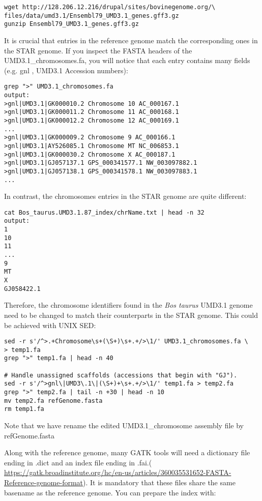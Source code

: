\begin{verbatim}
wget http://128.206.12.216/drupal/sites/bovinegenome.org/\
files/data/umd3.1/Ensembl79_UMD3.1_genes.gff3.gz
gunzip Ensembl79_UMD3.1_genes.gff3.gz
\end{verbatim}


It is crucial that entries in the reference genome match the corresponding ones in the STAR genome. If you inspect the FASTA headers of the UMD3.1\_chromosomes.fa, you will notice that each entry contains many fields (e.g. gnl , UMD3.1 Accession numbers):

\begin{verbatim}
grep ">" UMD3.1_chromosomes.fa
output:
>gnl|UMD3.1|GK000010.2 Chromosome 10 AC_000167.1
>gnl|UMD3.1|GK000011.2 Chromosome 11 AC_000168.1
>gnl|UMD3.1|GK000012.2 Chromosome 12 AC_000169.1
...
>gnl|UMD3.1|GK000009.2 Chromosome 9 AC_000166.1
>gnl|UMD3.1|AY526085.1 Chromosome MT NC_006853.1
>gnl|UMD3.1|GK000030.2 Chromosome X AC_000187.1
>gnl|UMD3.1|GJ057137.1 GPS_000341577.1 NW_003097882.1
>gnl|UMD3.1|GJ057138.1 GPS_000341578.1 NW_003097883.1
...
\end{verbatim}

In contrast, the chromosomes entries in the STAR genome are quite different:

\begin{verbatim}
cat Bos_taurus.UMD3.1.87_index/chrName.txt | head -n 32
output:
1
10
11
...
9
MT
X
GJ058422.1
\end{verbatim}

Therefore, the chromosome identifiers found in the \textit{Bos taurus} UMD3.1 genome need to be changed to match their counterparts in the STAR genome. This could be achieved with UNIX SED:

\begin{verbatim}
sed -r s'/^>.+Chromosome\s+(\S+)\s+.+/>\1/' UMD3.1_chromosomes.fa \
> temp1.fa
grep ">" temp1.fa | head -n 40

# Handle unassigned scaffolds (accessions that begin with "GJ").
sed -r s'/^>gnl\|UMD3\.1\|(\S+)+\s+.+/>\1/' temp1.fa > temp2.fa
grep ">" temp2.fa | tail -n +30 | head -n 10
mv temp2.fa refGenome.fasta
rm temp1.fa
\end{verbatim}

Note that we have rename the edited UMD3.1\_chromosome assembly file by refGenome.fasta

Along with the reference genome, many GATK tools will need a dictionary file ending in .dict and an index file ending in .fai.(\href{https://gatk.broadinstitute.org/hc/en-us/articles/360035531652-FASTA-Reference-genome-format}{ https://gatk.broadinstitute.org/hc/en-us/articles/360035531652-FASTA-Reference-genome-format}). It is mandatory that these files share the same basename as the reference genome. You can prepare the index with:

